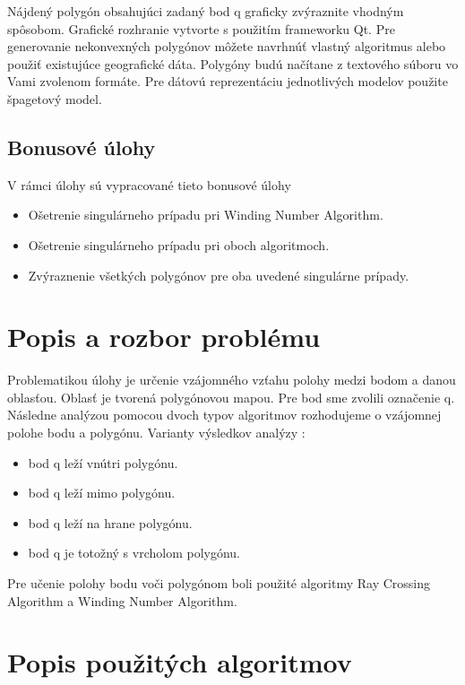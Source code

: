 \documentclass[12pt]{article}
\begin{document}
Nájdený polygón obsahujúci zadaný bod q graficky zvýraznite vhodným spôsobom. Grafické rozhranie vytvorte s použitím frameworku Qt. Pre generovanie nekonvexných polygónov môžete navrhnúť vlastný algoritmus alebo použiť existujúce geografické dáta. Polygóny budú načítane z textového súboru vo Vami zvolenom formáte. Pre dátovú reprezentáciu jednotlivých modelov použite špagetový model.

\subsection{Bonusové úlohy}
V rámci úlohy sú vypracované tieto bonusové úlohy

\begin{itemize}
\item Ošetrenie singulárneho prípadu pri Winding Number Algorithm.
\item Ošetrenie singulárneho prípadu pri oboch algoritmoch.
\item Zvýraznenie všetkých polygónov pre oba uvedené singulárne prípady.
\end{itemize}

\section{Popis a rozbor problému}
 Problematikou úlohy je určenie vzájomného vzťahu polohy medzi bodom a danou oblasťou. Oblasť je tvorená polygónovou mapou. Pre bod sme zvolili označenie q. Následne analýzou pomocou dvoch typov algoritmov rozhodujeme o vzájomnej polohe bodu a polygónu.
Varianty výsledkov analýzy :

\begin{itemize}
\item bod q leží vnútri polygónu.
\item bod q leží mimo polygónu.
\item bod q leží na hrane polygónu.
\item bod q je totožný s vrcholom polygónu.
\end{itemize}

Pre učenie polohy bodu voči polygónom boli použité algoritmy Ray Crossing Algorithm a Winding Number Algorithm.

\section {Popis použitých algoritmov}
\end{document}
